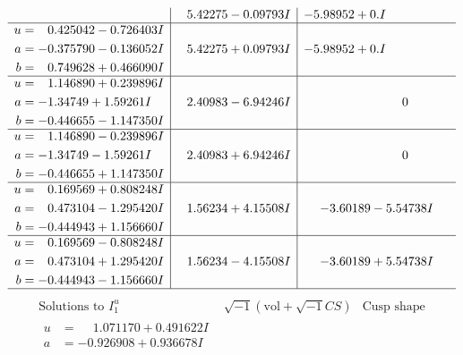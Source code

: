 \documentclass[1p]{elsarticle_modified}
\theoremstyle{definition}
\newcommand{\I}{\sqrt{-1}}
\begin{document}
$$\begin{array}{c|c|c}
 & \phantom{-}5.42275 - 0.09793 I & -5.98952 + 0. I\phantom{ +0.000000I} \\ \hline\begin{aligned}
u &= \phantom{-}0.425042 - 0.726403 I \\
a &= -0.375790 - 0.136052 I \\
b &= \phantom{-}0.749628 + 0.466090 I\end{aligned}
 & \phantom{-}5.42275 + 0.09793 I & -5.98952 + 0. I\phantom{ +0.000000I} \\ \hline\begin{aligned}
u &= \phantom{-}1.146890 + 0.239896 I \\
a &= -1.34749 + 1.59261 I \\
b &= -0.446655 - 1.147350 I\end{aligned}
 & \phantom{-}2.40983 - 6.94246 I & \phantom{-0.000000 } 0 \\ \hline\begin{aligned}
u &= \phantom{-}1.146890 - 0.239896 I \\
a &= -1.34749 - 1.59261 I \\
b &= -0.446655 + 1.147350 I\end{aligned}
 & \phantom{-}2.40983 + 6.94246 I & \phantom{-0.000000 } 0 \\ \hline\begin{aligned}
u &= \phantom{-}0.169569 + 0.808248 I \\
a &= \phantom{-}0.473104 - 1.295420 I \\
b &= -0.444943 + 1.156660 I\end{aligned}
 & \phantom{-}1.56234 + 4.15508 I & -3.60189 - 5.54738 I \\ \hline\begin{aligned}
u &= \phantom{-}0.169569 - 0.808248 I \\
a &= \phantom{-}0.473104 + 1.295420 I \\
b &= -0.444943 - 1.156660 I\end{aligned}
 & \phantom{-}1.56234 - 4.15508 I & -3.60189 + 5.54738 I\\
 \hline 
 \end{array}$$\newpage$$\begin{array}{c|c|c}  
\text{Solutions to }I^u_{1}& \I (\text{vol} + \sqrt{-1}CS) & \text{Cusp shape}\\
 \hline 
\begin{aligned}
u &= \phantom{-}1.071170 + 0.491622 I \\
a &= -0.926908 + 0.936678 I \\

\end{aligned}
\end{array}$$
\end{document}
